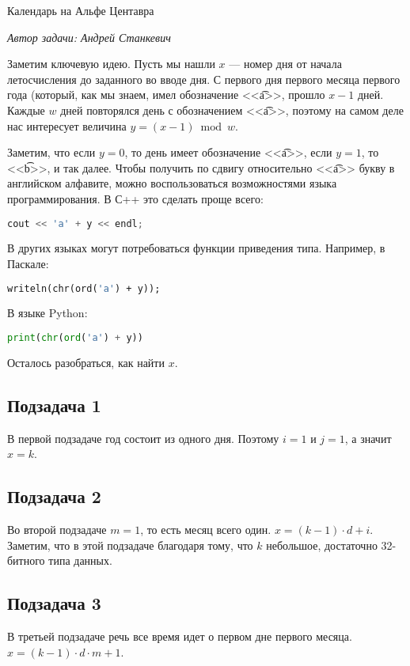 \begin{tutorial}{Календарь на Альфе Центавра}

\medskip
\textit{Автор задачи: Андрей Станкевич}
\medskip

Заметим ключевую идею. Пусть мы нашли $x$ --- номер дня от начала летосчисления до заданного во вводе дня. С первого дня первого месяца первого года (который, как мы знаем, имел обозначение <<\t{a}>>, прошло $x - 1$ дней. Каждые $w$ дней повторялся день с обозначением <<\t{a}>>, поэтому на самом деле нас интересует величина $y = (x-1) \bmod w$.  

Заметим, что если $y = 0$, то день имеет обозначение <<\t{a}>>, если $y = 1$, то <<\t{b}>>, и так далее. Чтобы получить по сдвигу относительно <<\t{a}>> букву в английском алфавите, можно воспользоваться возможностями языка программирования. В С++ это сделать проще всего:

\begin{lstlisting}[language=c++]
    cout << 'a' + y << endl;
\end{lstlisting}

В других языках могут потребоваться функции приведения типа. Например, в Паскале:

\begin{lstlisting}[language=Pascal]
    writeln(chr(ord('a') + y));
\end{lstlisting}

В языке Python:

\begin{lstlisting}[language=Python]
    print(chr(ord('a') + y))
\end{lstlisting}

Осталось разобраться, как найти $x$.

\subsection*{Подзадача 1}
В первой подзадаче год состоит из одного дня. Поэтому $i = 1$ и $j = 1$, а значит $x = k$.

\subsection*{Подзадача 2}
Во второй подзадаче $m=1$, то есть месяц всего один. $x = (k-1) \cdot d + i$.
Заметим, что в этой подзадаче благодаря тому, что $k$ небольшое, достаточно 32-битного типа данных.

\subsection*{Подзадача 3}
В третьей подзадаче речь все время идет о первом дне первого месяца. $x = (k-1) \cdot d \cdot m + 1$.


\end{tutorial}
